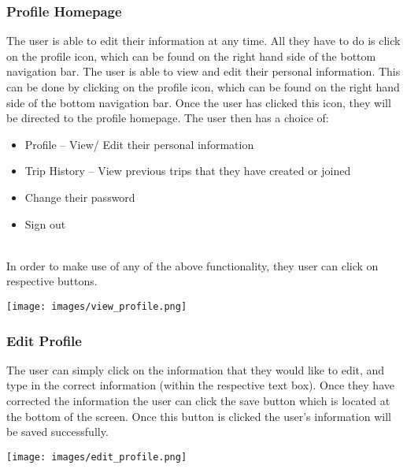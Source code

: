 \documentclass[hidelinks, 12pt, a4paper]{article}
\begin{document}
\subsubsection{Profile Homepage}
The user is able to edit their information at any time. All they have to do is click on the profile icon, which can be found on the right hand side of the bottom navigation bar. The user is able to view and edit their personal information. This can be done by clicking on the profile icon, which can be found on the right hand side of the bottom navigation bar. Once the user has clicked this icon, they will be directed to the profile homepage. The user then has a choice of:
\begin{itemize}
    \item Profile – View/ Edit their personal information
    \item Trip History – View previous trips that they have created or joined
    \item Change their password
    \item Sign out
\end{itemize} \\
In order to make use of any of the above functionality, they user can click on respective buttons.
\begin{center}
  \texttt{[image: images/view\_profile.png]}
\end{center}
\vspace{1cm}

\subsubsection{Edit Profile}
The user can simply click on the information that they would like to edit, and type in the correct information (within the respective text box). Once they have corrected the information the user can click the save button which is located at the bottom of the screen. Once this button is clicked the user's information will be saved successfully.
\begin{center}
  \texttt{[image: images/edit\_profile.png]}
\end{center}
\end{document}
